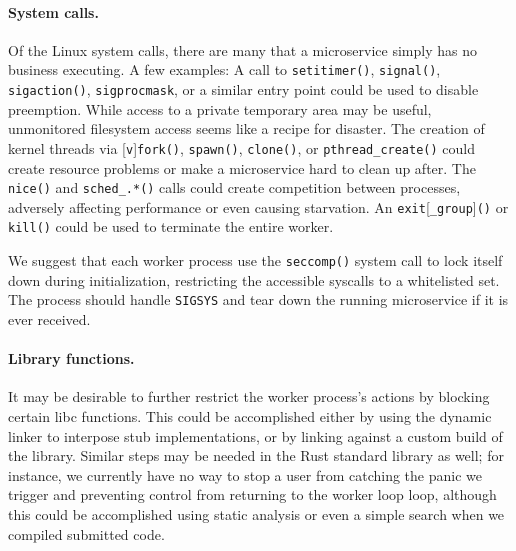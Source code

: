 \paragraph{System calls.}
Of the Linux system calls, there are many that a microservice simply has no business
executing.  A few examples:  A call to \texttt{setitimer()}, \texttt{signal()},
\texttt{sigaction()}, \texttt{sigprocmask}, or a similar entry point could be used to
disable preemption.  While access to a private temporary area may be useful,
unmonitored filesystem access seems like a recipe for disaster.  The creation of
kernel threads via [\texttt{v}]\texttt{fork()}, \texttt{spawn()}, \texttt{clone()},
or \texttt{pthread\_create()} could create resource problems or make a microservice
hard to clean up after.  The \texttt{nice()} and \texttt{sched\_.*()} calls could
create competition between processes, adversely affecting performance or even causing
starvation.  An \texttt{exit}[\texttt{\_group}]\texttt{()} or \texttt{kill()} could
be used to terminate the entire worker.

We suggest that each worker process use the \texttt{seccomp()} system call to lock
itself down during initialization, restricting the accessible syscalls to a
whitelisted set.  The process should handle \texttt{SIGSYS} and tear down the running
microservice if it is ever received.

\paragraph{Library functions.}
It may be desirable to further restrict the worker process's actions by blocking
certain libc functions.  This could be accomplished either by using the dynamic
linker to interpose stub implementations, or by linking against a custom build of the
library.  Similar steps may be needed in the Rust standard library as well; for
instance, we currently have no way to stop a user from catching the panic we trigger
and preventing control from returning to the worker loop loop, although this could be
accomplished using static analysis or even a simple search when we compiled submitted
code.

